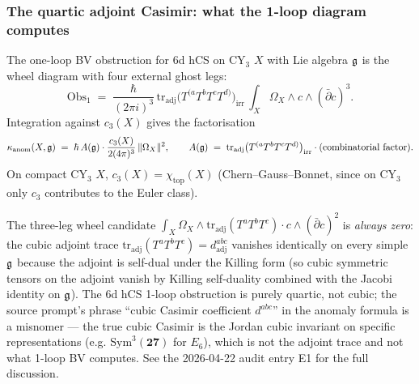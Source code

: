 \subsubsection{The quartic adjoint Casimir: what the 1-loop diagram computes}

\begin{theorem}\ClaimStatusTheorem
\label{opus13:thm:1loop-anomaly}
The one-loop BV obstruction for 6d hCS on CY$_3$ $X$ with Lie algebra
$\mathfrak{g}$ is the wheel diagram with four external ghost legs:
\begin{equation}
  \mathrm{Obs}_1 \;=\; \frac{\hbar}{(2\pi i)^3}\,
  \mathrm{tr}_{\mathrm{adj}}\bigl(T^{(a}T^b T^c T^{d)}\bigr)_{\mathrm{irr}}\,
  \int_X \Omega_X \wedge c \wedge (\bar\partial c)^{3}.
  \label{opus13:eq:obs1}
\end{equation}
Integration against $c_3(X)$ gives the factorisation
\begin{equation}
  \kappa_{\mathrm{anom}}(X, \mathfrak{g})
  \;=\; \hbar\, A(\mathfrak{g}) \cdot \frac{c_3(X)}{2(4\pi)^3}\,
  \|\Omega_X\|^2,
  \qquad
  A(\mathfrak{g}) \;=\; \mathrm{tr}_{\mathrm{adj}}\bigl(T^{(a}T^bT^cT^{d)}\bigr)_{\mathrm{irr}}
  \cdot\text{(combinatorial factor)}.
  \label{opus13:eq:anomaly-factorisation}
\end{equation}
On compact CY$_3$ $X$, $c_3(X) = \chi_{\mathrm{top}}(X)$ (Chern--Gauss--Bonnet,
since on CY$_3$ only $c_3$ contributes to the Euler class).
\end{theorem}

\begin{remark}\ClaimStatusRemark
\label{opus13:rem:no-cubic}
The three-leg wheel candidate
$\int_X\Omega_X\wedge\mathrm{tr}_{\mathrm{adj}}(T^aT^bT^c)\cdot
c\wedge(\bar\partial c)^2$ is \emph{always zero}: the cubic adjoint
trace $\mathrm{tr}_{\mathrm{adj}}(T^aT^bT^c) = d^{abc}_{\mathrm{adj}}$
vanishes identically on every simple $\mathfrak{g}$ because the adjoint is
self-dual under the Killing form (so cubic symmetric tensors on the
adjoint vanish by Killing self-duality combined with the Jacobi
identity on $\mathfrak{g}$). The 6d hCS 1-loop obstruction is purely quartic, not
cubic; the source prompt's phrase ``cubic Casimir coefficient $d^{abc}$''
in the anomaly formula is a misnomer — the true cubic Casimir is the
Jordan cubic invariant on specific representations (e.g.
$\mathrm{Sym}^3(\mathbf{27})$ for $E_6$), which is not the adjoint
trace and not what 1-loop BV computes. See the 2026-04-22 audit entry
E1 for the full discussion.
\end{remark}

